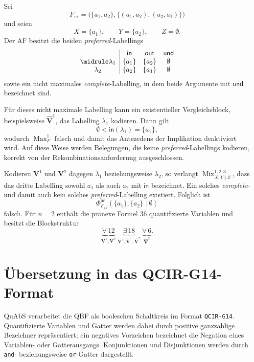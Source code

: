 \begin{Example}[Zweizyklus]
\label{ex:preferred-prenex-two-cycle}
Sei
\[
F_{\leftrightarrow}
=
\bigl(
    \{a_1,a_2\},
    \{(a_1,a_2),(a_2,a_1)\}
\bigr)
\]
und seien
\[
X=\{a_1\},
\qquad
Y=\{a_2\},
\qquad
Z=\emptyset.
\]
Der AF besitzt die beiden \emph{preferred}-Labellings
\[
\begin{array}{c|ccc}
    & \mathsf{in} & \mathsf{out} & \mathsf{und}\\
    \midrule
    \lambda_1 & \{a_1\} & \{a_2\} & \emptyset\\
    \lambda_2 & \{a_2\} & \{a_1\} & \emptyset
\end{array}
\]
sowie ein nicht maximales \emph{complete}-Labelling, in dem beide
Argumente mit \(\mathsf{und}\) bezeichnet sind.

Für dieses nicht maximale Labelling kann ein existentieller
Vergleichsblock, beispielsweise
\(\widehat{\mathbf V}^{1}\), das Labelling \(\lambda_1\) kodieren. Dann
gilt
\[
\emptyset
<
\mathsf{in}(\lambda_1)=\{a_1\},
\]
wodurch \(\operatorname{Max}_F^1\) falsch und damit das Antezedens der
Implikation deaktiviert wird. Auf diese Weise werden Belegungen, die
keine \emph{preferred}-Labellings kodieren, korrekt von der
Rekombinationsanforderung ausgeschlossen.

Kodieren \(\mathbf V^1\) und \(\mathbf V^2\) dagegen
\(\lambda_1\) beziehungsweise \(\lambda_2\), so verlangt
\(\operatorname{Mix}^{1,2,3}_{X,Y\mid Z}\), dass das dritte Labelling
sowohl \(a_1\) als auch \(a_2\) mit \(\mathsf{in}\) bezeichnet. Ein
solches \emph{complete}- und damit auch kein solches
\emph{preferred}-Labelling existiert. Folglich ist
\[
\Phi_{F_{\leftrightarrow}}^{\mathsf{pr}}
    (\{a_1\},\{a_2\}\mid\emptyset)
\]
falsch. Für \(n=2\) enthält die pränexe Formel \(36\) quantifizierte
Variablen und besitzt die Blockstruktur
\[
\underbrace{\forall\,12}_{\mathbf V^1,\mathbf V^2}\;
\underbrace{\exists\,18}_{\mathbf V^3,
    \widehat{\mathbf V}^{1},\widehat{\mathbf V}^{2}}\;
\underbrace{\forall\,6}_{\widehat{\mathbf V}^{3}}.
\]
\end{Example}

\section{Übersetzung in das QCIR-G14-Format}
\label{sec:preferred-qcir}

QuAbS verarbeitet die QBF als booleschen Schaltkreis im Format
\texttt{QCIR-G14}. Quantifizierte Variablen und Gatter werden dabei
durch positive ganzzahlige Bezeichner repräsentiert; ein negatives
Vorzeichen bezeichnet die Negation eines Variablen- oder
Gatterausgangs. Konjunktionen und Disjunktionen werden durch
\texttt{and}- beziehungsweise \texttt{or}-Gatter dargestellt.

